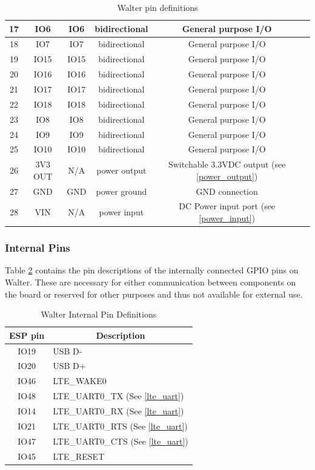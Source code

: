 \documentclass[11pt]{article}
\begin{document}
\begin{table}[!h]
\begin{center}
\begin{tabular}{|c|c|c|c|c|p{9.5cm}|}
\hline
17 & IO6 & IO6 & bidirectional & General purpose I/O \\
\hline
18 & IO7 & IO7 & bidirectional & General purpose I/O \\
\hline
19 & IO15 & IO15 & bidirectional & General purpose I/O \\
\hline
20 & IO16 & IO16 & bidirectional & General purpose I/O \\
\hline
21 & IO17 & IO17 & bidirectional & General purpose I/O \\
\hline
22 & IO18 & IO18 & bidirectional & General purpose I/O \\
\hline
23 & IO8 & IO8 & bidirectional & General purpose I/O \\
\hline
24 & IO9 & IO9 & bidirectional & General purpose I/O \\
\hline
25 & IO10 & IO10 & bidirectional & General purpose I/O \\
\hline
26 & 3V3 OUT & N/A & power output & Switchable 3.3VDC output (see \ref{power_output}) \\
\hline
27 & GND & GND & power ground & GND connection \\
\hline
28 & VIN & N/A & power input & DC Power input port (see \ref{power_input})\\
\hline
\end{tabular}
\caption{\label{table_exteral_pin}Walter pin definitions}
\end{center}
\end{table}
\newpage

\subsubsection{Internal Pins} \label{internal_pins}
Table \ref{table_interal_pin} contains the pin descriptions of the internally connected GPIO pins on Walter. These are necessary for either communication between components on the board or reserved for other purposes and thus not available for external use.

\begin{table}[!h]
    \centering
    \begin{tabular}{|c|p{9.5cm}|}
    \hline
    {\bf ESP pin} & \multicolumn{1}{c|}{\bf Description} \\
    \hline
    \hline
    IO19 & USB D-\\
    \hline
    IO20 & USB D+\\
    \hline
    IO46 & LTE\_WAKE0 \\
    \hline
    IO48 & LTE\_UART0\_TX (See \ref{lte_uart})\\
    \hline
    IO14 & LTE\_UART0\_RX (See \ref{lte_uart})\\
    \hline
    IO21 & LTE\_UART0\_RTS (See \ref{lte_uart})\\
    \hline
    IO47 & LTE\_UART0\_CTS (See \ref{lte_uart})\\
    \hline
    IO45 & LTE\_RESET\\
    \hline
    \end{tabular}
    \caption{\label{table_interal_pin}Walter Internal Pin Definitions}
\end{table}
\end{document}
